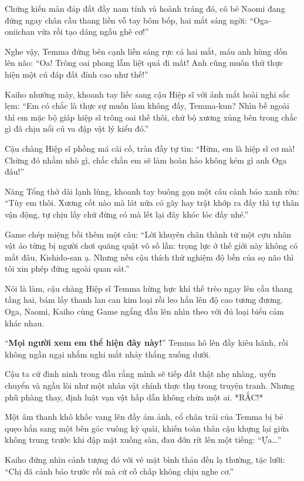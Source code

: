 \documentclass[../main.tex]{subfiles}
\begin{document}
Chứng kiến màn đáp đất đầy nam tính và hoành tráng đó, cô bé Naomi đang đứng ngay chân cầu thang liền vỗ tay bôm bốp, hai mắt sáng ngời: ``Oga-oniichan vừa rồi tạo dáng ngầu ghê cơ!''

Nghe vậy, Temma đứng bên cạnh liền sáng rực cả hai mắt, máu anh hùng dồn lên não: ``Oa! Trông oai phong lẫm liệt quá đi mất! Anh cũng muốn thử thực hiện một cú đáp đất đỉnh cao như thế!''

Kaiho nhướng mày, khoanh tay liếc sang cậu Hiệp sĩ với ánh mắt hoài nghi sắc lẹm: ``Em có chắc là thực sự muốn làm không đấy, Temma-kun? Nhìn bề ngoài thì em mặc bộ giáp hiệp sĩ trông oai thế thôi, chứ bộ xương xủng bên trong chắc gì đã chịu nổi cú va đập vật lý kiểu đó.''

Cậu chàng Hiệp sĩ phồng má cãi cố, tràn đầy tự tin: ``Hừm, em là hiệp sĩ cơ mà! Chừng đó nhằm nhò gì, chắc chắn em sẽ làm hoàn hảo không kém gì anh Oga đâu!''

Nàng Tổng thở dài lạnh lùng, khoanh tay buông gọn một câu cảnh báo xanh rờn: ``Tùy em thôi. Xương cốt nào mà lát nữa có gãy hay trật khớp ra đấy thì tự thân vận động, tự chịu lấy chứ đừng có mà lết lại đây khóc lóc đấy nhé.''

Game chép miệng bồi thêm một câu: ``Lời khuyên chân thành từ một cựu nhân vật ảo từng bị người chơi quăng quật vô số lần: trọng lực ở thế giới này không có mắt đâu, Kishido-san ạ. Nhưng nếu cậu thích thử nghiệm độ bền của sọ não thì tôi xin phép đứng ngoài quan sát.''

Nói là làm, cậu chàng Hiệp sĩ Temma hừng hực khí thế trèo ngay lên cầu thang tầng hai, bám lấy thanh lan can kim loại rồi leo hẳn lên độ cao tương đương. Oga, Naomi, Kaiho cùng Game ngẩng đầu lên nhìn theo với đủ loại biểu cảm khác nhau.

``\textbf{Mọi người xem em thể hiện đây này!}'' Temma hô lên đầy kiêu hãnh, rồi không ngần ngại nhắm nghi mắt nhảy thẳng xuống dưới.

Cậu ta cứ đinh ninh trong đầu rằng mình sẽ tiếp đất thật nhẹ nhàng, uyển chuyển và ngầu lòi như một nhân vật chính thực thụ trong truyện tranh. Nhưng phũ phàng thay, định luật vạn vật hấp dẫn không chừa một ai. *RẮC!*

Một âm thanh khô khốc vang lên đầy ám ảnh, cổ chân trái của Temma bị bẻ quẹo hẳn sang một bên góc vuông kỳ quái, khiến toàn thân cậu khựng lại giữa không trung trước khi đập mặt xuống sàn, đau đớn rít lên một tiếng: ``Ựa\dots''


Kaiho đứng nhìn cảnh tượng đó với vẻ mặt bình thản đến lạ thường, tặc lưỡi: ``Chị đã cảnh báo trước rồi mà cứ cố chấp không chịu nghe cơ.''
\end{document}
